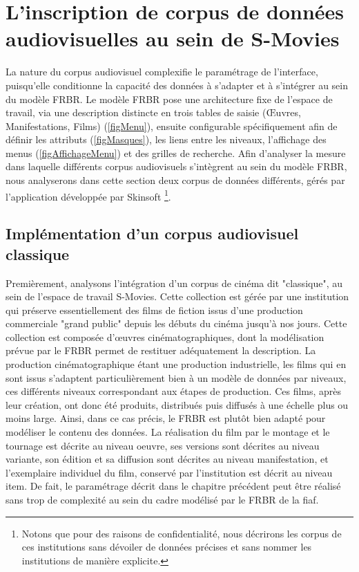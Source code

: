 \section{\label{I_2_B} L'inscription de corpus de données audiovisuelles au sein de S-Movies} 

La nature du corpus audiovisuel complexifie le paramétrage de l'interface, puisqu'elle conditionne la capacité des données à s'adapter et à s'intégrer au sein du modèle \gls{FRBR}. Le modèle \gls{FRBR} pose une architecture fixe de l'espace de travail, via une description distincte en trois tables de saisie (Œuvres, Manifestations, Films) (\cref{figMenu}), ensuite configurable spécifiquement afin de définir les attributs (\cref{figMasques}), les liens entre les niveaux, l'affichage des menus (\cref{figAffichageMenu}) et des grilles de recherche. Afin d'analyser la mesure dans laquelle différents corpus audiovisuels s'intègrent au sein du modèle \gls{FRBR}, nous analyserons dans cette section deux corpus de données différents, gérés par l’application développée par Skinsoft \footnote{Notons que pour des raisons de confidentialité, nous décrirons les corpus de ces institutions sans dévoiler de données précises et sans nommer les institutions de manière explicite.}.  

\subsection{Implémentation d'un corpus audiovisuel classique}

Premièrement, analysons l'intégration d'un corpus de cinéma dit "classique", au sein de l'espace de travail S-Movies. Cette collection est gérée par une institution qui préserve essentiellement des films de fiction issus d'une production commerciale "grand public" depuis les débuts du cinéma jusqu'à nos jours. Cette collection est composée d’œuvres cinématographiques, dont la modélisation prévue par le \gls{FRBR} permet de restituer adéquatement la description. La production cinématographique étant une production industrielle, les films qui en sont issus s'adaptent particulièrement bien à un modèle de données par niveaux, ces différents niveaux correspondant aux étapes de production. Ces films, après leur création, ont donc été produits, distribués puis diffusés à une échelle plus ou moins large. Ainsi, dans ce cas précis, le \gls{FRBR} est plutôt bien adapté pour modéliser le contenu des données. La réalisation du film par le montage et le tournage est décrite au niveau \gls{oeuvre}, ses versions sont décrites au niveau \gls{variante}, son édition et sa diffusion sont décrites au niveau \gls{manifestation}, et l'exemplaire individuel du film, conservé par l'institution est décrit au niveau \gls{item}. De fait, le paramétrage décrit dans le chapitre précédent peut être réalisé sans trop de complexité au sein du cadre modélisé par le \gls{FRBR} de la \gls{fiaf}.

